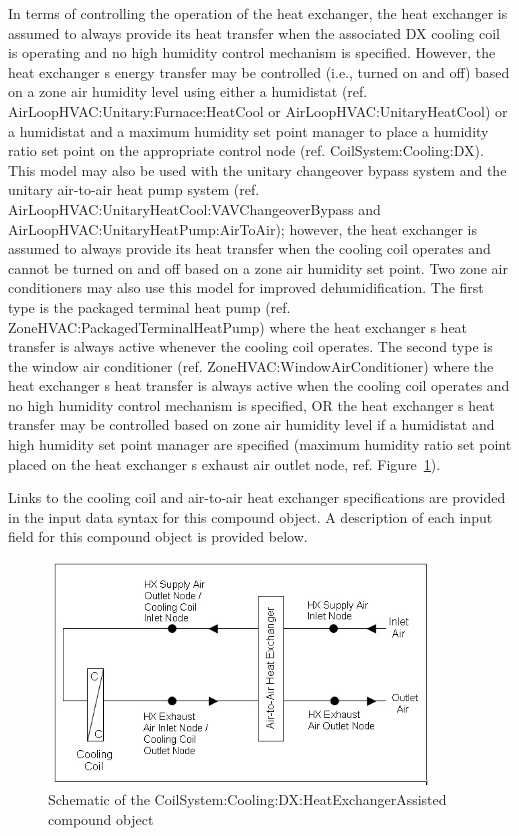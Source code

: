 In terms of controlling the operation of the heat exchanger, the heat exchanger is assumed to always provide its heat transfer when the associated DX cooling coil is operating and no high humidity control mechanism is specified. However, the heat exchanger s energy transfer may be controlled (i.e., turned on and off) based on a zone air humidity level using either a humidistat (ref. AirLoopHVAC:Unitary:Furnace:HeatCool or AirLoopHVAC:UnitaryHeatCool) or a humidistat and a maximum humidity set point manager to place a humidity ratio set point on the appropriate control node (ref. CoilSystem:Cooling:DX). This model may also be used with the unitary changeover bypass system and the unitary air-to-air heat pump system (ref. AirLoopHVAC:UnitaryHeatCool:VAVChangeoverBypass and AirLoopHVAC:UnitaryHeatPump:AirToAir); however, the heat exchanger is assumed to always provide its heat transfer when the cooling coil operates and cannot be turned on and off based on a zone air humidity set point. Two zone air conditioners may also use this model for improved dehumidification. The first type is the packaged terminal heat pump (ref. ZoneHVAC:PackagedTerminalHeatPump) where the heat exchanger s heat transfer is always active whenever the cooling coil operates. The second type is the window air conditioner (ref. ZoneHVAC:WindowAirConditioner) where the heat exchanger s heat transfer is always active when the cooling coil operates and no high humidity control mechanism is specified, OR the heat exchanger s heat transfer may be controlled based on zone air humidity level if a humidistat and high humidity set point manager are specified (maximum humidity ratio set point placed on the heat exchanger s exhaust air outlet node, ref. Figure~\ref{fig:schematic-of-the-coilsystem-cooling-dx}).

Links to the cooling coil and air-to-air heat exchanger specifications are provided in the input data syntax for this compound object. A description of each input field for this compound object is provided below.

\begin{figure}[hbtp] %
\centering
\includegraphics[width=0.9\textwidth, height=0.9\textheight, keepaspectratio=true]{media/image369.png}
\caption{Schematic of the CoilSystem:Cooling:DX:HeatExchangerAssisted compound object \protect \label{fig:schematic-of-the-coilsystem-cooling-dx}}
\end{figure}

